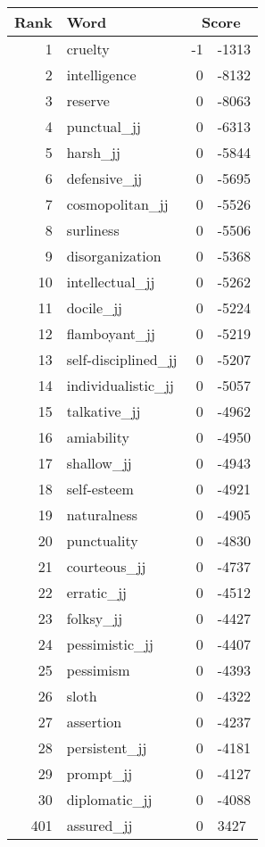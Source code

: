 \begin{longtable}[!htbp]{| rlr@{.}l |}
    \hline
    \textbf{Rank} & \textbf{Word} & \multicolumn{2}{c|}{\textbf{Score}} \\
    \hline
    \endhead
    1 & cruelty & -1 & -1313 \\
    2 & intelligence & 0 & -8132 \\
    3 & reserve & 0 & -8063 \\
    4 & punctual\_jj & 0 & -6313 \\
    5 & harsh\_jj & 0 & -5844 \\
    6 & defensive\_jj & 0 & -5695 \\
    7 & cosmopolitan\_jj & 0 & -5526 \\
    8 & surliness & 0 & -5506 \\
    9 & disorganization & 0 & -5368 \\
    10 & intellectual\_jj & 0 & -5262 \\
    11 & docile\_jj & 0 & -5224 \\
    12 & flamboyant\_jj & 0 & -5219 \\
    13 & self-disciplined\_jj & 0 & -5207 \\
    14 & individualistic\_jj & 0 & -5057 \\
    15 & talkative\_jj & 0 & -4962 \\
    16 & amiability & 0 & -4950 \\
    17 & shallow\_jj & 0 & -4943 \\
    18 & self-esteem & 0 & -4921 \\
    19 & naturalness & 0 & -4905 \\
    20 & punctuality & 0 & -4830 \\
    21 & courteous\_jj & 0 & -4737 \\
    22 & erratic\_jj & 0 & -4512 \\
    23 & folksy\_jj & 0 & -4427 \\
    24 & pessimistic\_jj & 0 & -4407 \\
    25 & pessimism & 0 & -4393 \\
    26 & sloth & 0 & -4322 \\
    27 & assertion & 0 & -4237 \\
    28 & persistent\_jj & 0 & -4181 \\
    29 & prompt\_jj & 0 & -4127 \\
    30 & diplomatic\_jj & 0 & -4088 \\
    401 & assured\_jj & 0 & 3427 \\

\end{longtable}
